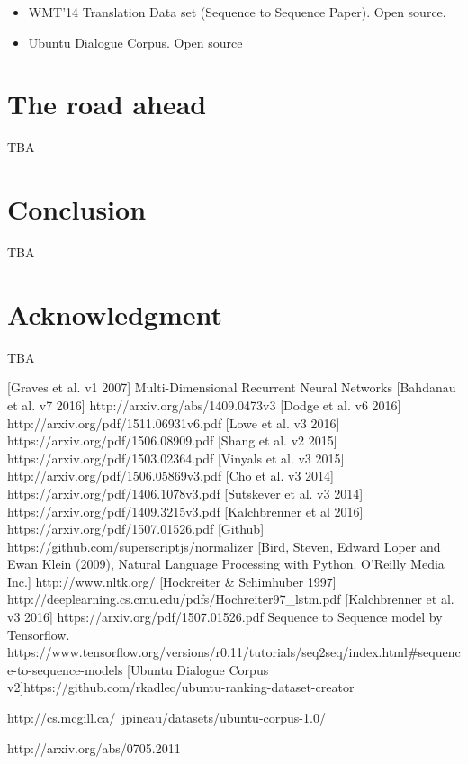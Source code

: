 \documentclass{article} %
\begin{document}
\begin{itemize}
    \item WMT'14 Translation Data set (Sequence to Sequence Paper). Open source.
    \item Ubuntu Dialogue Corpus. Open source
\end{itemize}

\section{The road ahead}
TBA

\section{Conclusion}
TBA
\section{Acknowledgment}
TBA
\begin{thebibliography}{1}
[Graves et al. v1 2007] Multi-Dimensional Recurrent Neural Networks
[Bahdanau et al. v7 2016] http://arxiv.org/abs/1409.0473v3
[Dodge et al. v6 2016] http://arxiv.org/pdf/1511.06931v6.pdf
[Lowe et al. v3 2016] https://arxiv.org/pdf/1506.08909.pdf
[Shang et al. v2 2015] https://arxiv.org/pdf/1503.02364.pdf
[Vinyals et al. v3 2015] http://arxiv.org/pdf/1506.05869v3.pdf
[Cho et al. v3 2014] https://arxiv.org/pdf/1406.1078v3.pdf
[Sutskever et al. v3 2014] https://arxiv.org/pdf/1409.3215v3.pdf
[Kalchbrenner et al 2016] https://arxiv.org/pdf/1507.01526.pdf
[Github] https://github.com/superscriptjs/normalizer
[Bird, Steven, Edward Loper and Ewan Klein (2009), Natural Language Processing with Python. O’Reilly Media Inc.] http://www.nltk.org/
[Hockreiter \& Schimhuber 1997] http://deeplearning.cs.cmu.edu/pdfs/Hochreiter97\_lstm.pdf
[Kalchbrenner et al. v3 2016] https://arxiv.org/pdf/1507.01526.pdf
Sequence to Sequence model by Tensorflow. https://www.tensorflow.org/versions/r0.11/tutorials/seq2seq/index.html\#sequence-to-sequence-models
[Ubuntu Dialogue Corpus v2]https://github.com/rkadlec/ubuntu-ranking-dataset-creator

http://cs.mcgill.ca/~jpineau/datasets/ubuntu-corpus-1.0/
\end{thebibliography} http://arxiv.org/abs/0705.2011
\end{document}
